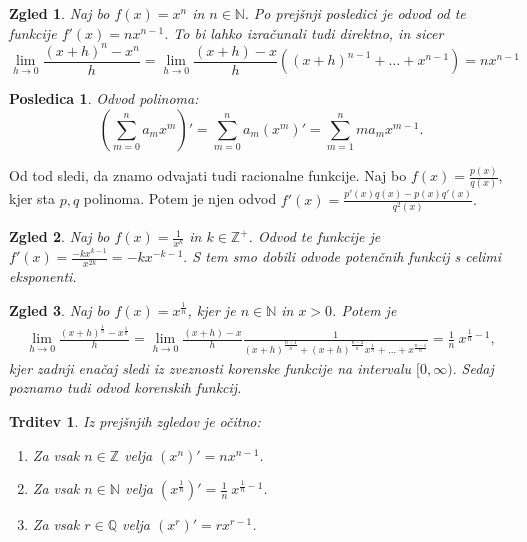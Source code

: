 \documentclass[10pt, a4paper]{article}
\newtheorem{posledica}[izr]{Posledica}
\newtheorem{trditev}[izr]{Trditev}
\newtheorem{zgled}{Zgled}[section]
\newcommand{\N}{\mathbb {N}}
\newcommand{\Z}{\mathbb {Z}}
\newcommand{\Q}{\mathbb {Q}}
\newcommand{\limf}[3]{\lim_{#1 \to #2} {#3}}
\begin{document}
\begin{zgled}
    Naj bo $f(x) = x^n$ in $n \in \N.$ Po prejšnji posledici je odvod od te funkcije $f'(x) = n x^{n-1}$.
    To bi lahko izračunali tudi direktno, in sicer 
    $$\limf{h}{0}{\frac{(x+h)^n - x^n}{h}} = \limf{h}{0}{\frac{(x+h) - x}{h}} ((x+h)^{n-1} + \dots + x^{n-1}) = nx^{n-1}$$
\end{zgled}

\begin{posledica}
    Odvod polinoma:
    $$\left(\sum_{m = 0} ^n a_m x^m \right)' = \sum_{m = 0} ^n a_m (x^m)' = \sum_{m=1} ^n m a_m x^{m-1}.$$
\end{posledica}
Od tod sledi, da znamo odvajati tudi racionalne funkcije. 
Naj bo $f(x) = \frac{p(x)}{q(x)}$, kjer sta $p,q$ polinoma. Potem je njen odvod
$f'(x) = \frac{p'(x)q(x) - p(x)q'(x)}{q^2(x)}.$

\begin{zgled}
    Naj bo $f(x) = {\frac{1}{x^k}}$ in $k \in \Z^+$. 
    Odvod te funkcije je $f'(x) = \frac{-kx^{k-1}}{x^{2k}} = -kx^{-k-1}.$
    S tem smo dobili odvode potenčnih funkcij s celimi eksponenti.
\end{zgled}
\begin{zgled}
    Naj bo $f(x) = x^{\frac{1}{n}}$, kjer je $n \in \N$ in $x > 0$. Potem je 
    \begin{align*}
        \limf{h}{0}{\frac{(x+h)^{\frac{1}{n}} - x^{\frac{1}{n}}}{h}} 
        = \limf{h}{0}{\frac{(x+h) - x}{h} \frac{1}{(x+h)^{\frac{n-1}{n}} + (x+h)^{\frac{n-2}{n}} x^{\frac{1}{n}} + \dots + x^{\frac{n-1}{n}}}}
        = \frac{1}{n}\ x^{\frac{1}{n} -1},
    \end{align*}
    kjer zadnji enačaj sledi iz zveznosti korenske funkcije na intervalu $[0, \infty).$ Sedaj poznamo tudi odvod korenskih funkcij.
\end{zgled}

\begin{trditev}
    Iz prejšnjih zgledov je očitno:
    \begin{enumerate}
        \item Za vsak $n \in \Z$ velja $(x^n)' = nx^{n-1}$.
        \item Za vsak $n \in \N$ velja $(x^{\frac{1}{n}})' = \frac{1}{n}\ x^{\frac{1}{n} - 1}$.
        \item Za vsak $r \in \Q$ velja $(x^r)' = rx^{r-1}$.
    \end{enumerate}   
\end{trditev}
\end{document}
